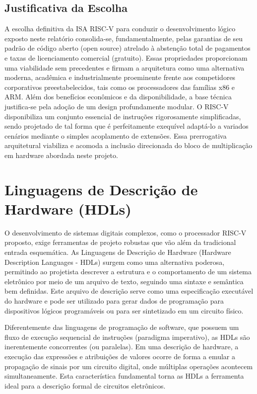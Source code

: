 \documentclass[
	12pt,				%
	oneside,
	a4paper,			%
	english,			%
	french,				%
	spanish,			%
	brazil,				%
	]{abntex2}
\begin{document}
\subsection{Justificativa da Escolha}
A escolha definitiva da ISA RISC-V para conduzir o desenvolvimento lógico exposto neste relatório consolida-se, fundamentalmente, pelas garantias de seu padrão de código aberto (open source) atrelado à abstenção total de pagamentos e taxas de licenciamento comercial (gratuito). Essas propriedades proporcionam uma viabilidade sem precedentes e firmam a arquitetura como uma alternativa moderna, acadêmica e industrialmente proeminente frente aos competidores corporativos preestabelecidos, tais como os processadores das famílias x86 e ARM. Além dos benefícios econômicos e da disponibilidade, a base técnica justifica-se pela adoção de um design profundamente modular. O RISC-V disponibiliza um conjunto essencial de instruções rigorosamente simplificadas, sendo projetado de tal forma que é perfeitamente exequível adaptá-lo a variados cenários mediante o simples acoplamento de extensões. Essa prerrogativa arquitetural viabiliza e acomoda a inclusão direcionada do bloco de multiplicação em hardware abordada neste projeto.

\section{Linguagens de Descrição de Hardware (HDLs)}

O desenvolvimento de sistemas digitais complexos, como o processador RISC-V proposto, exige ferramentas de projeto robustas que vão além da tradicional entrada esquemática. As Linguagens de Descrição de Hardware (Hardware Description Languages - HDLs) surgem como uma alternativa poderosa, permitindo ao projetista descrever a estrutura e o comportamento de um sistema eletrônico por meio de um arquivo de texto, seguindo uma sintaxe e semântica bem definidas. Este arquivo de descrição serve como uma especificação executável do hardware e pode ser utilizado para gerar dados de programação para dispositivos lógicos programáveis ou para ser sintetizado em um circuito físico.

Diferentemente das linguagens de programação de software, que possuem um fluxo de execução sequencial de instruções (paradigma imperativo), as HDLs são inerentemente concorrentes (ou paralelas). Em uma descrição de hardware, a execução das expressões e atribuições de valores ocorre de forma a emular a propagação de sinais por um circuito digital, onde múltiplas operações acontecem simultaneamente. Esta característica fundamental torna as HDLs a ferramenta ideal para a descrição formal de circuitos eletrônicos.
\end{document}
